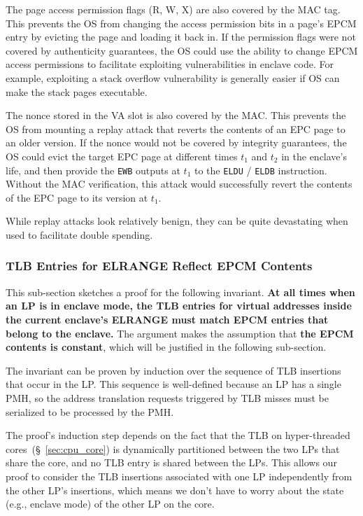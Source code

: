 The page access permission flags (R, W, X) are also covered by the MAC tag.
This prevents the OS from changing the access permission bits in a page's EPCM
entry by evicting the page and loading it back in. If the permission flags were
not covered by authenticity guarantees, the OS could use the ability to change
EPCM access permissions to facilitate exploiting vulnerabilities in enclave
code. For example, exploiting a stack overflow vulnerability is generally
easier if OS can make the stack pages executable.

The nonce stored in the VA slot is also covered by the MAC. This prevents the
OS from mounting a replay attack that reverts the contents of an EPC page to an
older version. If the nonce would not be covered by integrity guarantees, the
OS could evict the target EPC page at different times $t_1$ and $t_2$ in the
enclave's life, and then provide the \texttt{EWB} outputs at $t_1$ to the
\texttt{ELDU} / \texttt{ELDB} instruction. Without the MAC verification, this
attack would successfully revert the contents of the EPC page to its version
at $t_1$.

While replay attacks look relatively benign, they can be quite devastating when
used to facilitate double spending.


\subsubsection{TLB Entries for ELRANGE Reflect EPCM Contents}

This sub-section sketches a proof for the following invariant. \textbf{At all
times when an LP is in enclave mode, the TLB entries for virtual addresses
inside the current  enclave's ELRANGE must match EPCM entries that belong to
the enclave.} The argument makes the assumption that \textbf{the EPCM contents
is constant}, which will be justified in the following sub-section.

The invariant can be proven by induction over the sequence of TLB insertions
that occur in the LP. This sequence is well-defined because an LP has a single
PMH, so the address translation requests triggered by TLB misses must be
serialized to be processed by the PMH.

The proof's induction step depends on the fact that the TLB on hyper-threaded
cores~(\S~\ref{sec:cpu_core}) is dynamically partitioned between the two LPs
that share the core, and no TLB entry is shared between the LPs. This allows
our proof to consider the TLB insertions associated with one LP independently
from the other LP's insertions, which means we don't have to worry about the
state (e.g., enclave mode) of the other LP on the core.

